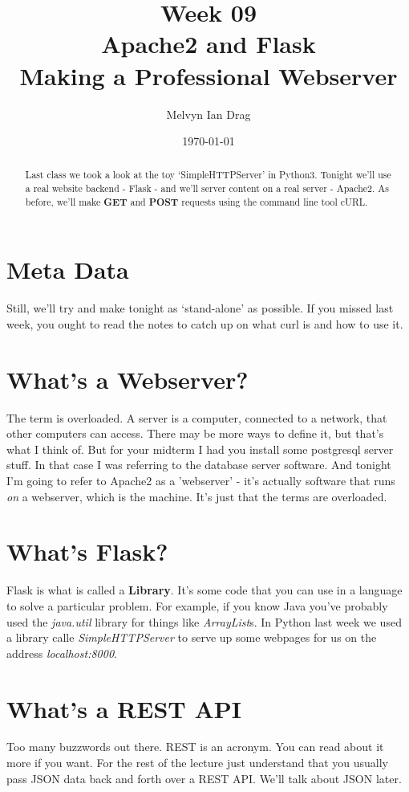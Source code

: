 \documentclass[10pt]{article}
\title{\textbf{Week 09} \\
\LARGE Apache2 and Flask \\
\Large Making a Professional Webserver}
\author{
	Melvyn Ian Drag
}
\date{\today}
\begin{document}
\maketitle

\begin{abstract}
Last class we took a look at the toy `SimpleHTTPServer' in Python3. Tonight we'll use a real website backend - Flask - and we'll server content on a real server - Apache2. As before, we'll make \textbf{GET} and \textbf{POST} requests using the command line tool cURL.
\end{abstract}

\section{Meta Data}

Still, we'll try and make tonight as `stand-alone' as possible. If you missed last week, you ought to read the notes to catch up on what curl is and how to use it.

\section{What's a Webserver?}
The term is overloaded. A server is a computer, connected to a network, that other computers can access. There may be more ways to define it, but that's what I think of. But for your midterm I had you install some postgresql server stuff. In that case I was referring to the database server software. And tonight I'm going to refer to Apache2 as a 'webserver' - it's actually software that runs \textit{on} a webserver, which is the machine. It's just that the terms are overloaded.

\section{What's Flask?}
Flask is what is called a \textbf{Library}. It's some code that you can use in a language to solve a particular problem. For example, if you know Java you've probably used the \textit{java.util} library for things like \textit{ArrayList}s. In Python last week we used a library calle \textit{SimpleHTTPServer} to serve up some webpages for us on the address \textit{localhost:8000}.

\section{What's a REST API}
Too many buzzwords out there. REST is an acronym. You can read about it more if you want. For the rest of the lecture just understand that you usually pass JSON data back and forth over a REST API. We'll talk about JSON later.
\end{document}
